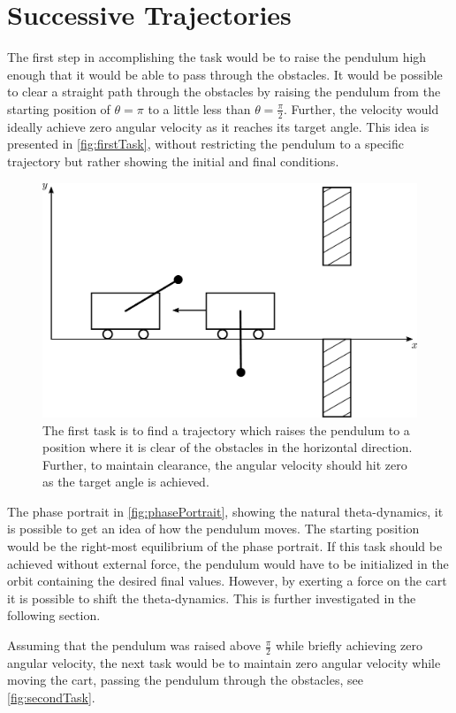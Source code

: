 \section{Successive Trajectories}
The first step in accomplishing the task would be to raise the pendulum high enough that it would be able to pass through the obstacles. It would be possible to clear a straight path through the obstacles by raising the pendulum from the starting position of $\theta = \pi$ to a little less than $\theta = \frac{\pi}{2}$. Further, the velocity would ideally achieve zero angular velocity as it reaches its target angle. This idea is presented in \autoref{fig:firstTask}, without restricting the pendulum to a specific trajectory but rather showing the initial and final conditions.

\begin{figure}[H]
  \includegraphics[width=.5\textwidth]{figures/firstTask}
  \caption{The first task is to find a trajectory which raises the pendulum to a position where it is clear of the obstacles in the horizontal direction. Further, to maintain clearance, the angular velocity should hit zero as the target angle is achieved.}
  \label{fig:firstTask}
\end{figure}

The phase portrait in \autoref{fig:phasePortrait}, showing the natural theta-dynamics, it is possible to get an idea of how the pendulum moves. The starting position would be the right-most equilibrium of the phase portrait. If this task should be achieved without external force, the pendulum would have to be initialized in the orbit containing the desired final values. However, by exerting a force on the cart it is possible to shift the theta-dynamics. This is further investigated in the following section.

Assuming that the pendulum was raised above $\frac{\pi}{2}$ while briefly achieving zero angular velocity, the next task would be to maintain zero angular velocity while moving the cart, passing the pendulum through the obstacles, see \autoref{fig:secondTask}.

